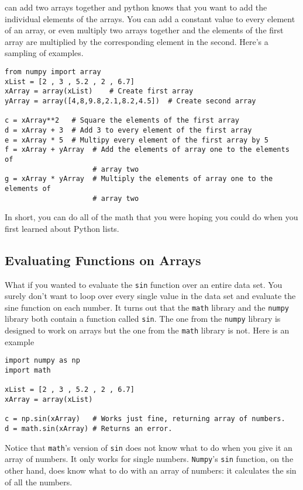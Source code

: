 can add two arrays together and python knows that you want to add the
individual elements of the arrays.  You can add a constant value to every
element of an array, or even multiply two arrays together and
the elements of the first array are multiplied by the corresponding element
in the second.  Here's a sampling of examples.
\begin{Verbatim}
from numpy import array
xList = [2 , 3 , 5.2 , 2 , 6.7]
xArray = array(xList)    # Create first array
yArray = array([4,8,9.8,2.1,8.2,4.5])  # Create second array

c = xArray**2   # Square the elements of the first array
d = xArray + 3  # Add 3 to every element of the first array
e = xArray * 5  # Multipy every element of the first array by 5
f = xArray + yArray  # Add the elements of array one to the elements of
                     # array two
g = xArray * yArray  # Multiply the elements of array one to the elements of
                     # array two
\end{Verbatim}
In short, you can do all of the math that you were hoping you could do
when you first learned about Python lists.
\subsection*{Evaluating Functions on Arrays}
What if you wanted to evaluate the \texttt{sin} function over an
entire data set.  You surely don't want to loop over every single
value in the data set and evaluate the sine function on each number.
It turns out that the \texttt{math} library and the \texttt{numpy}
library both contain a function called \texttt{sin}.  The one from the
\texttt{numpy} library is designed to work on arrays but the one from
the \texttt{math} library is not. Here is an example
\begin{Verbatim}
import numpy as np
import math 

xList = [2 , 3 , 5.2 , 2 , 6.7]
xArray = array(xList)

c = np.sin(xArray)   # Works just fine, returning array of numbers.
d = math.sin(xArray) # Returns an error.
\end{Verbatim}
Notice that \texttt{math}'s version of \texttt{sin} does not
know what to do when you give it an array of numbers.  It only works
for single numbers.  \texttt{Numpy}'s \texttt{sin} function, on the
other hand, does know what to do with an array of numbers: it
calculates the sin of all the numbers.


